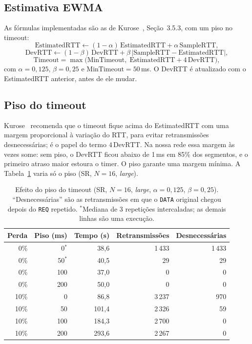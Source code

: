 \documentclass[11pt,a4paper]{article}
\begin{document}
\subsection{Estimativa EWMA}

As fórmulas implementadas são as de Kurose~\cite{kurose}, Seção~3.5.3, com um
piso no timeout:
\begin{equation}
  \text{EstimatedRTT} \leftarrow (1-\alpha)\,\text{EstimatedRTT} + \alpha\,\text{SampleRTT},
\end{equation}
\begin{equation}
  \text{DevRTT} \leftarrow (1-\beta)\,\text{DevRTT} + \beta\,\lvert \text{SampleRTT} - \text{EstimatedRTT}\rvert,
\end{equation}
\begin{equation}
  \text{Timeout} = \max\!\bigl(\text{MinTimeout},\; \text{EstimatedRTT} + 4\,\text{DevRTT}\bigr),
\end{equation}
com $\alpha = 0{,}125$, $\beta = 0{,}25$ e $\text{MinTimeout} = 50$\,ms. O DevRTT
é atualizado com o EstimatedRTT anterior, antes de ele mudar.

\subsection{Piso do timeout}
\label{sec:piso}

Kurose~\cite{kurose} recomenda que o timeout fique acima do EstimatedRTT com uma
margem proporcional à variação do RTT, para evitar retransmissões
desnecessárias; é o papel do termo $4\,\text{DevRTT}$. Na nossa rede essa
margem às vezes some: sem piso, o DevRTT ficou abaixo de 1\,ms em 85\% dos
segmentos, e o primeiro atraso maior estoura o timer. O piso garante uma margem mínima. A
Tabela~\ref{tab:piso} varia só o piso (SR, $N=16$, \emph{large}).

\begin{table}[H]
\centering\small
\begin{tabular}{rrrrr}
\toprule
Perda & Piso (ms) & Tempo (s) & Retransmissões & Desnecessárias \\
\midrule
0\%  & 0$^*$  & 38,6  & 1\,433 & 1\,433 \\
0\%  & 50$^*$ & 40,5  & 29     & 29 \\
0\%  & 100 & 37,0  & 0      & 0 \\
0\%  & 200 & 50,0  & 0      & 0 \\
\midrule
10\% & 0   & 86,8  & 3\,237 & 970 \\
10\% & 50  & 101,4 & 2\,326 & 59 \\
10\% & 100 & 184,3 & 2\,700 & 0 \\
10\% & 200 & 293,6 & 2\,267 & 0 \\
\bottomrule
\end{tabular}
\caption{Efeito do piso do timeout (SR, $N=16$, \emph{large}, $\alpha=0{,}125$,
$\beta=0{,}25$). ``Desnecessárias'' são as retransmissões em que o
\texttt{DATA} original chegou depois do \texttt{REQ} repetido. $^*$Mediana de
3 repetições intercaladas; as demais linhas são uma execução.}
\label{tab:piso}
\end{table}
\end{document}
